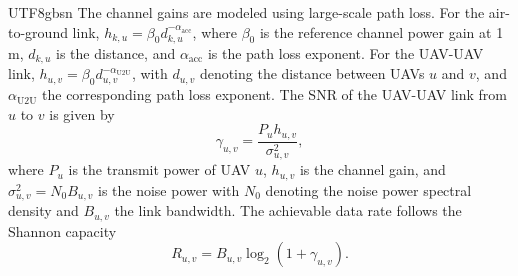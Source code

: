 \documentclass[journal]{IEEEtran}
\begin{document}
\begin{CJK*}{UTF8}{gbsn}
The channel gains are modeled using large-scale path loss. For the air-to-ground link,
$h_{k,u} = \beta_0 d_{k,u}^{-\alpha_{\mathrm{acc}}}$,
where \(\beta_0\) is the reference channel power gain at 1 m, \(d_{k,u}\) is the distance, and \(\alpha_{\mathrm{acc}}\) is the path loss exponent. For the UAV-UAV link, $h_{u,v} = \beta_0 d_{u,v}^{-\alpha_{\mathrm{U2U}}}$, with \(d_{u,v}\) denoting the distance between UAVs \(u\) and \(v\), and \(\alpha_{\mathrm{U2U}}\) the corresponding path loss exponent. 
The SNR of the UAV-UAV link from \(u\) to \(v\) is given by
\begin{equation}\label{e2}
\gamma_{u,v} = \frac{P_u h_{u,v}}{\sigma_{u,v}^2},
\end{equation}
where \(P_u\) is the transmit power of UAV \(u\), \(h_{u,v}\) is the channel gain, and \(\sigma_{u,v}^2 = N_0 B_{u,v}\) is the noise power with \(N_0\) denoting the noise power spectral density and \(B_{u,v}\) the link bandwidth. The achievable data rate follows the Shannon capacity
\begin{equation}\label{e3}
R_{u,v} = B_{u,v} \log_2 (1 + \gamma_{u,v}).
\end{equation}




\end{CJK*}
\end{document}
